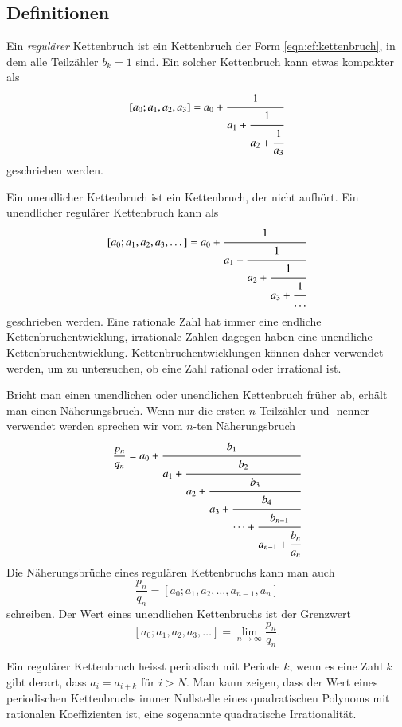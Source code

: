 %
%
%
\subsection{Definitionen \label{subsection:cf:definition}}
Ein {\em regulärer} Kettenbruch ist ein Kettenbruch der Form
%
\eqref{eqn:cf:kettenbruch}, in dem alle Teilzähler $b_k=1$ sind.
Ein solcher Kettenbruch kann etwas kompakter als
\[
[a_0;a_1,a_2,a_3]
=
a_0+\cfrac{1}{
a_1+\cfrac{1}{
a_2+\cfrac{1}{
a_3}}}
\]
geschrieben werden.

Ein unendlicher Kettenbruch ist ein Kettenbruch, der nicht aufhört.
Ein unendlicher regulärer Kettenbruch kann als
\[
[a_0;a_1,a_2,a_3,\dots]
=
a_0+\cfrac{1}{
a_1+\cfrac{1}{
a_2+\cfrac{1}{
a_3+\cfrac{1}{\dots}}}}
\]
geschrieben werden.
Eine rationale Zahl hat immer eine endliche Kettenbruchentwicklung,
irrationale Zahlen dagegen haben eine unendliche Kettenbruchentwicklung.
Kettenbruchentwicklungen können daher verwendet werden, 
um zu untersuchen, ob eine Zahl rational oder irrational ist.

Bricht man einen unendlichen oder unendlichen Kettenbruch früher ab,
erhält man einen Näherungsbruch.
Wenn nur die ersten $n$ Teilzähler und -nenner verwendet werden
sprechen wir vom $n$-ten Näherungsbruch
\[
\frac{p_n}{q_n}
=
a_0+\cfrac{b_1}{
a_1+\cfrac{b_2}{
a_2+\cfrac{b_3}{
a_3+\cfrac{b_4}{
\dots+\cfrac{b_{n-1}}{
a_{n-1}+\cfrac{b_n}{a_n}}}}}}
\]
Die Näherungsbrüche eines regulären Kettenbruchs kann man auch
\[
\frac{p_n}{q_n}
=
[a_0;a_1,a_2,\dots,a_{n-1},a_n]
\]
schreiben.
Der Wert eines unendlichen Kettenbruchs ist der Grenzwert 
\[
[a_0;a_1,a_2,a_3,\dots]
=
\lim_{n\to\infty} \frac{p_n}{q_n}.
\]

Ein regulärer Kettenbruch heisst periodisch mit Periode $k$,
wenn es eine Zahl $k$ gibt derart, dass $a_i=a_{i+k}$ für $i>N$.
Man kann zeigen, dass der Wert eines periodischen Kettenbruchs 
immer Nullstelle eines quadratischen Polynoms mit rationalen
Koeffizienten ist, eine sogenannte quadratische Irrationalität.

